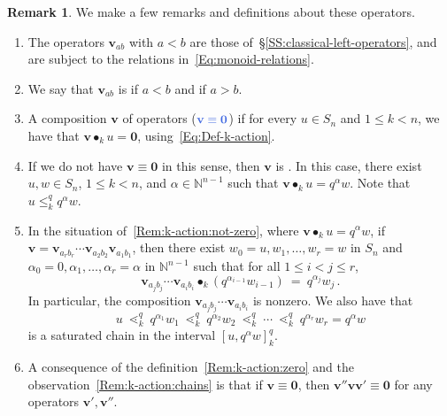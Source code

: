 \documentclass[12pt,oneside,reqno]{amsart}
\theoremstyle{definition}
\newtheorem{remark}[theorem]{Remark}
\numberwithin{equation}{section}
\newcommand{\NN}{{\mathbb N}}
\newcommand{\qv}{{\mathbf v}}
\newcommand{\bzero}{{\mathbf 0}}
\DeclareMathOperator{\kactionop}{{\scriptstyle \bullet}}
\newcommand{\kaction}[1][k]{\kactionop_{#1}}
\newcommand{\defcolor}[1]{{\color{RoyalBlue}#1}}
\newcommand{\demph}[1]{\defcolor{{\sl #1}}}
\begin{document}
\begin{remark}\label{Rem:k-action}
We make a few remarks and definitions about these operators.

\begin{enumerate}[label=(\roman*)]
  \item
      The operators $\qv_{ab}$ with $a<b$ are those
      of~\S\ref{SS:classical-left-operators}, and are subject to the
      relations in~\eqref{Eq:monoid-relations}.

  \item
        We say that ${\qv}_{ab}$ is \demph{classical} if $a<b$
        and \demph{quantum} if $a>b$.

  \item  \label{Rem:k-action:zero}
    A composition $\qv$ of operators \demph{is zero} ($\defcolor{\qv\equiv \bzero}$) if for every $u\in S_n$
    and $1\leq k<n$, we have that $\qv\kaction u= \bzero$, using~\eqref{Eq:Def-k-action}.

  \item  \label{Rem:k-action:not-zero}
    If we do not have $\qv\equiv\bzero$ in this sense, then $\qv$ is \demph{nonzero}.
    In this case, there exist $u,w\in S_n$, $1\leq k<n$, and $\alpha\in\NN^{n-1}$
    such that $\qv\kaction u= q^\alpha w$.
    Note that $u\leq_k^q q^\alpha w$.

  \item  \label{Rem:k-action:chains}
    In the situation of~\ref{Rem:k-action:not-zero}, where $\qv\kaction u=q^\alpha w$, if
    $\qv=\qv_{a_rb_r}\dotsb\qv_{a_2b_2}\qv_{a_1b_1}$, then there exist $w_0=u,w_1,\dotsc,w_r=w$ in $S_n$ and
    $\alpha_0=0, \alpha_1,\dotsc,\alpha_r=\alpha$ in $\NN^{n-1}$ such that for all $1\leq i<j\leq r$,
    \begin{equation}\label{Eq:sub-chain}
      \qv_{a_jb_j} \dotsb \qv_{a_ib_i} \kaction  (q^{\alpha_{i-1}}w_{i-1})\ =\ q^{\alpha_j} w_j\,.
    \end{equation}
    In particular, the composition $\qv_{a_jb_j} \dotsb \qv_{a_ib_i}$ is nonzero.
    We also have that 
    \[
      u\ \lessdot_k^q\ q^{\alpha_1}w_1\ \lessdot_k^q\ q^{\alpha_2}w_2
      \ \lessdot_k^q\ \dotsb\  \lessdot_k^q\ q^{\alpha_r}w_r=q^\alpha w
    \]
    is a saturated chain in the interval $[u,q^\alpha w]_k^q$.

  \item\label{Rem:k-action:zero_compose}
    A consequence of the definition~\ref{Rem:k-action:zero} and the observation~\ref{Rem:k-action:chains} is that if
    $\qv\equiv\bzero$, then $\qv''\qv\qv'\equiv\bzero$ for any operators $\qv',\qv''$.
    

\end{enumerate}
\end{remark}
\end{document}
